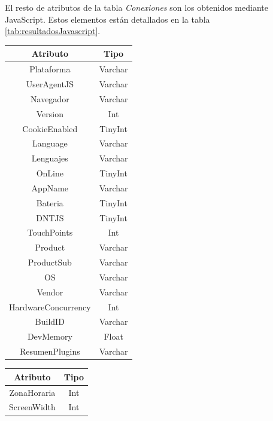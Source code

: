 \begin{itemize}
\begin{table}[tbp]
    \end{table}
    El resto de atributos de la tabla \textit{Conexiones} son los obtenidos mediante JavaScript. Estos elementos están detallados en la tabla \ref{tab:resultadosJavascript}.\newpage
    \begin{table}[tbp]
        \begin{minipage}[c]{85mm}
        \centering
            \begin{tabular}{c|c}
                \textbf{Atributo} & \textbf{Tipo} \\ \hline
                Plataforma & Varchar\\
                UserAgentJS & Varchar\\
                Navegador & Varchar\\
                Version & Int\\
                CookieEnabled & TinyInt\\
                Language & Varchar\\
                Lenguajes & Varchar\\
                OnLine & TinyInt\\
                AppName & Varchar\\
                Bateria & TinyInt\\
                DNTJS & TinyInt\\
                TouchPoints & Int\\
                Product & Varchar\\
                ProductSub & Varchar\\
                OS & Varchar\\
                Vendor & Varchar\\
                HardwareConcurrency & Int\\
                BuildID & Varchar\\
                DevMemory & Float\\
                ResumenPlugins & Varchar\\
            \end{tabular}
        \end{minipage}
        \begin{minipage}[c]{45mm}
        \centering
            \begin{tabular}{c|c}
                \textbf{Atributo} & \textbf{Tipo} \\ \hline
                ZonaHoraria & Int\\
                ScreenWidth & Int\\

\end{tabular}
\end{minipage}
\end{table}
\end{itemize}
